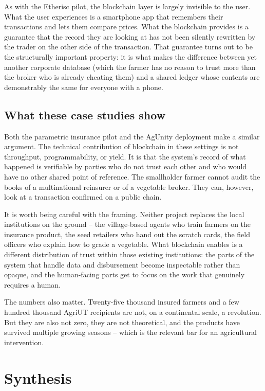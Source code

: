 As with the Etherisc pilot, the blockchain layer is largely invisible to
the user. What the user experiences is a smartphone app that remembers
their transactions and lets them compare prices. What the blockchain
provides is a guarantee that the record they are looking at has not been
silently rewritten by the trader on the other side of the transaction.
That guarantee turns out to be the structurally important property: it is
what makes the difference between yet another corporate database (which
the farmer has no reason to trust more than the broker who is already
cheating them) and a shared ledger whose contents are demonstrably the
same for everyone with a phone.

\subsection{What these case studies show}

Both the parametric insurance pilot and the AgUnity deployment make a
similar argument. The technical contribution of blockchain in these
settings is not throughput, programmability, or yield. It is that the
system's record of what happened is verifiable by parties who do not trust
each other and who would have no other shared point of reference. The
smallholder farmer cannot audit the books of a multinational reinsurer or
of a vegetable broker. They can, however, look at a transaction confirmed
on a public chain.

It is worth being careful with the framing. Neither project replaces the
local institutions on the ground -- the village-based agents who train
farmers on the insurance product, the seed retailers who hand out the
scratch cards, the field officers who explain how to grade a vegetable.
What blockchain enables is a different distribution of trust within those
existing institutions: the parts of the system that handle data and
disbursement become inspectable rather than opaque, and the human-facing
parts get to focus on the work that genuinely requires a human.

The numbers also matter. Twenty-five thousand insured farmers and a few
hundred thousand AgriUT recipients are not, on a continental scale, a
revolution. But they are also not zero, they are not theoretical, and the
products have survived multiple growing seasons -- which is the relevant
bar for an agricultural intervention.

\section{Synthesis}

